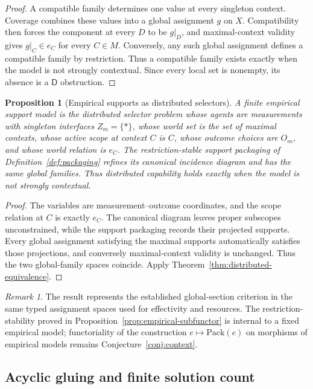 \documentclass[11pt]{article}
\theoremstyle{plain}
\newtheorem{proposition}[theorem]{Proposition}
\theoremstyle{definition}
\theoremstyle{remark}
\newtheorem{remark}[theorem]{Remark}
\begin{document}
\begin{proof}
A compatible family determines one value at every singleton context. Coverage
combines these values into a global assignment $g$ on $X$. Compatibility then
forces the component at every $D$ to be $g|_D$, and maximal-context validity
gives $g|_C\in e_C$ for every $C\in M$. Conversely, any such global assignment
defines a compatible family by restriction. Thus a compatible family exists
exactly when the model is not strongly contextual. Since every local set is
nonempty, its absence is a $\mathsf D$ obstruction.
\end{proof}

\begin{proposition}[Empirical supports as distributed selectors]
\label{prop:empirical-distributed}
A finite empirical support model is the distributed selector problem whose
agents are measurements with singleton interfaces $Z_m=\{\ast\}$, whose world
set is the set of maximal contexts, whose active scope at context $C$ is $C$,
whose outcome choices are $O_m$, and whose
world relation is $e_C$. The restriction-stable support packaging of
Definition~\ref{def:packaging} refines its canonical incidence diagram and has
the same global families. Thus distributed capability holds exactly when the model
is not strongly contextual.
\end{proposition}

\begin{proof}
The variables are measurement--outcome coordinates, and the scope relation at
$C$ is exactly $e_C$. The canonical diagram leaves proper subscopes
unconstrained, while the support packaging records their projected supports.
Every global assignment satisfying the maximal supports automatically satisfies
those projections, and conversely maximal-context validity is unchanged. Thus
the two global-family spaces coincide. Apply
Theorem~\ref{thm:distributed-equivalence}.
\end{proof}

\begin{remark}
The result represents the established global-section criterion in the same typed
assignment spaces used for effectivity and resources. The restriction-stability
proved in Proposition~\ref{prop:empirical-subfunctor} is internal to a fixed empirical model; functoriality of the
construction $e\mapsto\mathrm{Pack}(e)$ on morphisms of empirical models remains
Conjecture~\ref{conj:context}.
\end{remark}

\subsection{Acyclic gluing and finite solution count}
\end{document}
